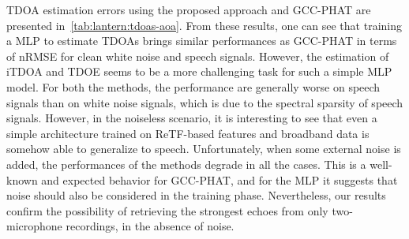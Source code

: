 \mynewline
\ac{TDOA} estimation errors using the proposed approach and \ac{GCC-PHAT} are presented in~\cref{tab:lantern:tdoas-aoa}.
From these results, one can see that training a \ac{MLP} to estimate \acp{TDOA} brings similar performances as \ac{GCC-PHAT} in terms of nRMSE for clean white noise and speech signals.
However, the estimation of \ac{iTDOA} and \ac{TDOE} seems to be a more challenging task for such a simple \ac{MLP} model.
For both the methods, the performance are generally worse on speech signals than on white noise signals, which is due to the spectral sparsity of speech signals.
However, in the noiseless scenario, it is interesting to see that even a simple architecture trained on \ac{ReTF}-based features and broadband data is somehow able to generalize to speech.
Unfortunately, when some external noise is added, the performances of the methods degrade in all the cases.
This is a well-known and expected behavior for \ac{GCC-PHAT}, and for the \ac{MLP} it suggests that noise should also be considered in the training phase.
Nevertheless, our results confirm the possibility of retrieving the strongest echoes from only two-microphone recordings, in the absence of noise.

